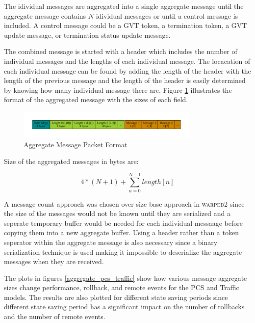 \documentclass[11pt]{book}
\begin{document}
The idividual messages are aggregated into a single aggregate message until the aggregate message
contains $N$ idividual messages or until a control message is included. A control message could be
a GVT token, a termination token, a GVT update message, or termination status update message.

The combined message is started with a header which includes the number of individual messages
and the lengths of each individual message. The locacation of each individual message can be
found by adding the length of the header with the length of the previous message and the length
of the header is easily determined by knowing how many individual message there are. Figure
\ref{aggregate_format} illustrates the format of the aggregated message with the sizes of each
field.

\begin{figure}
    \centering
    \includegraphics[width=0.8\textwidth,quiet]{figs/graphviz/aggregation_format.pdf}
    \caption{Aggregate Message Packet Format}\label{aggregate_format}
\end{figure}

Size of the aggregated messages in bytes are:

$$ 4 * (N + 1) + \sum_{n=0}^{N-1} length[n] $$

A message count approach was chosen over size base approach in \textsc{warped2} since the
size of the messages would not be known until they are serialized and a seperate temporary buffer
would be needed for each individual messaage before copying them into a new aggregate buffer.
Using a header rather than a token seperator within the aggregate message is also necessary
since a binary serialization technique is used making it impossible to deserialize the aggregate
messages when they are received.

The plots in figures \ref{aggregate_pcs_traffic} show how various message aggregate sizes change
performance, rollback, and remote events for the PCS and Traffic models. The results are also
plotted for different state saving periods since different state saving period has a significant
impact on the number of rollbacks and the number of remote events.
\end{document}
